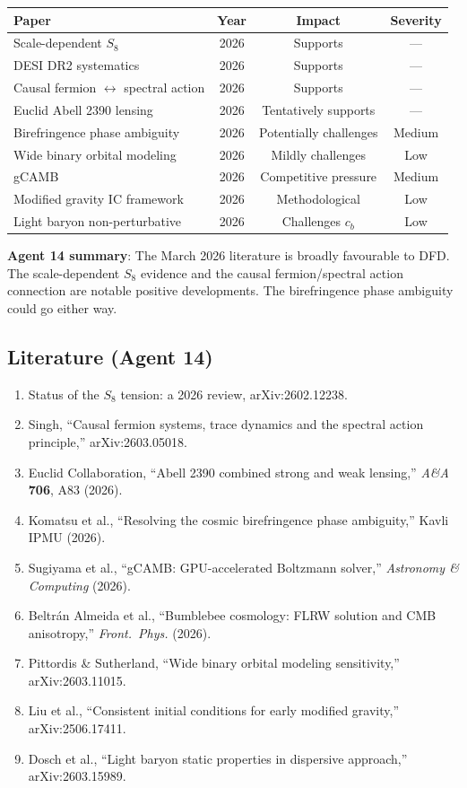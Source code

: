 \documentclass[11pt,a4paper]{article}
\begin{document}
\begin{center}
\begin{tabular}{lccc}
\toprule
\textbf{Paper} & \textbf{Year} & \textbf{Impact} & \textbf{Severity} \\
\midrule
Scale-dependent $S_8$ & 2026 & Supports & --- \\
DESI DR2 systematics & 2026 & Supports & --- \\
Causal fermion $\leftrightarrow$ spectral action & 2026 & Supports & --- \\
Euclid Abell 2390 lensing & 2026 & Tentatively supports & --- \\
Birefringence phase ambiguity & 2026 & Potentially challenges & Medium \\
Wide binary orbital modeling & 2026 & Mildly challenges & Low \\
gCAMB & 2026 & Competitive pressure & Medium \\
Modified gravity IC framework & 2026 & Methodological & Low \\
Light baryon non-perturbative & 2026 & Challenges $c_b$ & Low \\
\bottomrule
\end{tabular}
\end{center}

\textbf{Agent 14 summary}: The March 2026 literature is broadly favourable to DFD. The scale-dependent $S_8$ evidence and the causal fermion/spectral action connection are notable positive developments. The birefringence phase ambiguity could go either way.

\subsection{Literature (Agent 14)}

\begin{enumerate}
\item Status of the $S_8$ tension: a 2026 review, arXiv:2602.12238.
\item Singh, ``Causal fermion systems, trace dynamics and the spectral action principle,'' arXiv:2603.05018.
\item Euclid Collaboration, ``Abell 2390 combined strong and weak lensing,'' \textit{A\&A} \textbf{706}, A83 (2026).
\item Komatsu et al., ``Resolving the cosmic birefringence phase ambiguity,'' Kavli IPMU (2026).
\item Sugiyama et al., ``gCAMB: GPU-accelerated Boltzmann solver,'' \textit{Astronomy \& Computing} (2026).
\item Beltr\'an Almeida et al., ``Bumblebee cosmology: FLRW solution and CMB anisotropy,'' \textit{Front.\ Phys.} (2026).
\item Pittordis \& Sutherland, ``Wide binary orbital modeling sensitivity,'' arXiv:2603.11015.
\item Liu et al., ``Consistent initial conditions for early modified gravity,'' arXiv:2506.17411.
\item Dosch et al., ``Light baryon static properties in dispersive approach,'' arXiv:2603.15989.
\end{enumerate}
\end{document}
